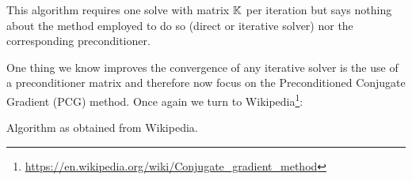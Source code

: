 \begin{remark} 
This algorithm requires one solve with matrix ${\mathbb{K}}$ per iteration 
but says nothing about the method employed to do so (direct or iterative solver)
nor the corresponding preconditioner.
\end{remark} 

One thing we know improves the convergence of any iterative solver is the use of a 
preconditioner matrix and therefore now focus on the Preconditioned Conjugate Gradient (PCG) method.
Once again we turn to Wikipedia\footnote{\url{https://en.wikipedia.org/wiki/Conjugate_gradient_method}}:

\begin{minipage}{0.40\textwidth}
\centering
{\captionfont Algorithm as obtained from Wikipedia.}\\
\end{minipage}\hfill
